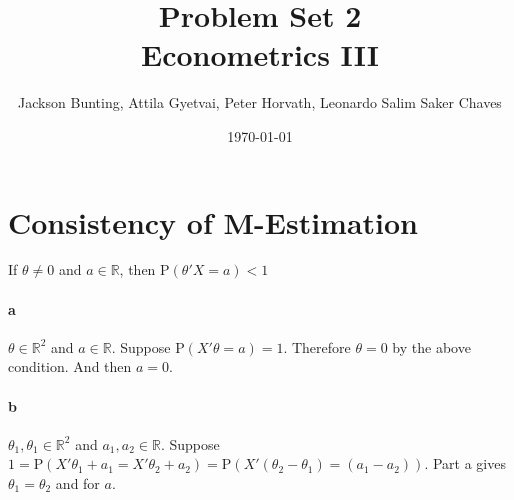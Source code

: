 \documentclass[11pt,letterpaper]{article}                  %
\title{Problem Set 2 \\ \medskip \Large{Econometrics III}}
\author{\Large Jackson Bunting, Attila Gyetvai, Peter Horvath, Leonardo Salim Saker Chaves}
\date{\today}
\begin{document}
\maketitle
\section{Consistency of M-Estimation} 


\begin{problem}
\end{problem}

\bigskip
\begin{problem}
If $\theta \neq 0$ and $a \in \mathbb{R}$, then
$\mathrm{P}(\theta' X = a) < 1$
\paragraph*{a}
$\theta \in \mathbb{R}^2$ and $a \in \mathbb{R}$. Suppose
$\mathrm{P}(X'\theta = a) = 1$. Therefore $\theta = 0$ by the above
condition. And then $a = 0$.

\paragraph*{b}
$\theta_1,\theta_1 \in \mathbb{R}^2$ and $a_1,a_2 \in
\mathbb{R}$. Suppose $1 = \mathrm{P}(X'\theta_1 + a_1 = X'\theta_2 +
a_2) = \mathrm{P}\left(X'(\theta_2-\theta_1) = (a_1-a_2)\right)$. Part
a gives $\theta_1 = \theta_2$ and for $a$.
\end{problem}
\end{document}
